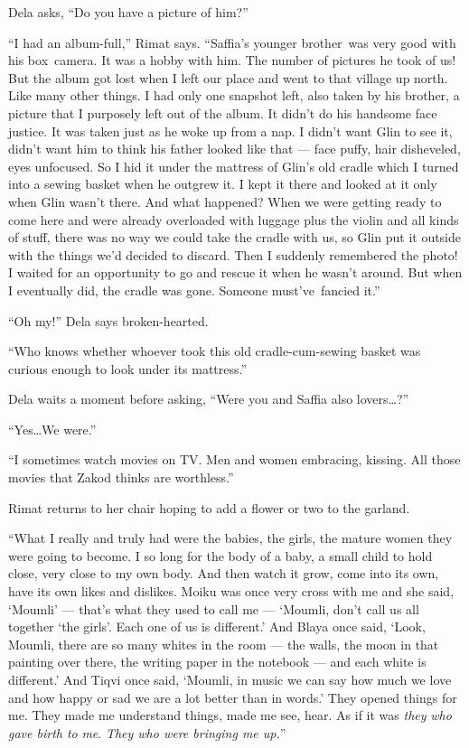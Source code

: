 \documentclass[twoside,11pt,openany]{book}
\begin{document}
Dela asks, ``Do you have a picture of him?''

``I had an album-full,'' Rimat says. ``Saffia's younger brother~was very good
with his box~camera. It was a hobby with him.  The number of pictures he took of us! But the album got lost when I left
our place and went to that village up north. Like many other things. I had only one snapshot left, also taken by his
brother, a picture that I purposely left out of the album. It didn't do his handsome face justice. It was taken just as
he woke up from a nap. I didn't want Glin to see it, didn't want him to think his father looked like that --- face
puffy, hair disheveled, eyes unfocused. So I hid it under the mattress of Glin's old cradle which I turned into a
sewing basket when he outgrew it. I kept it there and looked at it only when Glin wasn't there. And what happened? When
we were getting ready to come here and were already overloaded with luggage plus the violin and all kinds of stuff,
there was no way we could take the cradle with us, so Glin put it outside with the things we'd decided to discard. Then
I suddenly remembered the photo! I waited for an opportunity to go and rescue it when he wasn't around. But when I
eventually did, the cradle was gone. Someone must've~fancied it.''

``Oh my!''  Dela says broken-hearted.

``Who knows whether whoever took this old cradle-cum-sewing basket was curious enough to look under its
mattress.''

Dela waits a moment before asking, ``Were you and Saffia also lovers{\ldots}?''

``Yes{\ldots}We were.''

``I sometimes watch movies on TV. Men and women embracing, kissing. All those movies that Zakod thinks are
worthless.''

Rimat returns to her chair hoping to add a flower or two to the garland.

``What I really and truly had were the babies, the girls, the mature women they were going to become. I so
long for the body of a baby, a small child to hold close, very close to my own body. And then watch it grow, come into
its own, have its own likes and dislikes. Moiku was once very cross with me and she said, `Moumli' --- that's what
they used to call me --- `Moumli, don't call us all together `the girls'. Each one of us is different.'   And Blaya
once said, `Look, Moumli, there are so many whites in the room --- the walls, the moon in that painting over there, the
writing paper in the notebook --- and each white is different.' And Tiqvi once said, `Moumli, in music we can say how
much we love and how happy or sad we are a lot better than in words.' They opened things for me. They made me
understand things, made me see, hear. As if it was \textit{they} \textit{who gave birth to} \textit{me}.\textit{ They
who were bringing me up.}''
\end{document}
